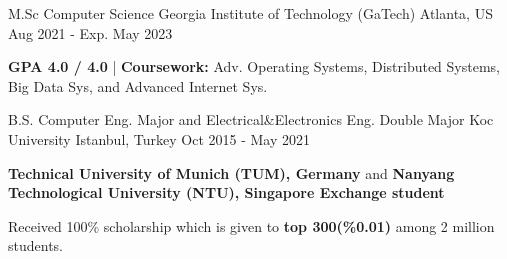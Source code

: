 \begin{cventries}
\vspace{2mm}
\cventry
    {M.Sc Computer Science } %
    {Georgia Institute of Technology (GaTech)} %
    {Atlanta, US} %
    {Aug 2021 - Exp. May 2023} %
    {\begin{cvghostitems} %
        \item {\textbf{GPA 4.0 / 4.0} | \textbf{Coursework:} Adv. Operating Systems, Distributed Systems, Big Data Sys, and Advanced Internet Sys. }
      \end{cvghostitems}
    }
\vspace{-1mm}
\vspace{-1mm}
\cvopenentry
    {B.S. Computer Eng. Major and Electrical\&Electronics Eng. Double Major} %
    {Koc University } %
    {Istanbul, Turkey} %
    {Oct 2015 - May 2021} %
    {\begin{cvghostitems} %
        \item {\textbf{Technical University of Munich (TUM), Germany} and \textbf{Nanyang Technological University (NTU), Singapore Exchange student 
        }}
        \item { Received 100\% scholarship which is given to \textbf{top 300(\%0.01)} among 2 million students.}
      \end{cvghostitems}
    }
\end{cventries}
